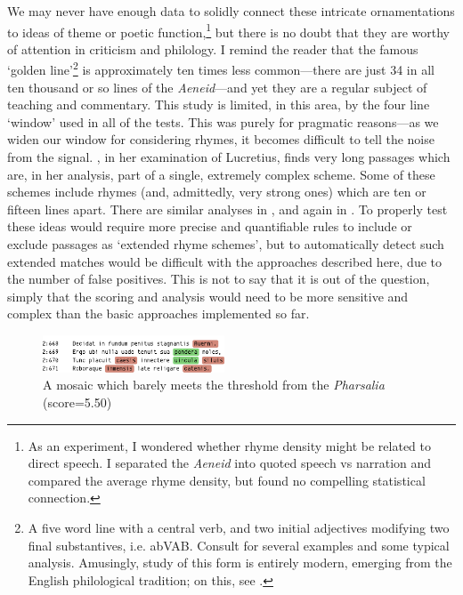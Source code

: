 \documentclass[twocolumn, switch]{article} %
\begin{document}
We may never have enough data to solidly connect these intricate
ornamentations to ideas of theme or poetic function,\footnote{
  As an experiment, I wondered whether rhyme density might be related to direct
  speech. I separated the \emph{Aeneid} into quoted speech vs narration and
  compared the average rhyme density, but found no compelling statistical connection.
}
but there is no doubt that they are worthy of attention in
criticism and philology. I remind the reader that the famous `golden line'\footnote{
  A five word line with a central verb, and two initial adjectives modifying
  two final substantives, i.e. abVAB. Consult
   for several examples and some typical
  analysis. Amusingly, study of this form is entirely modern, emerging from the
  English philological tradition; on this, see .
}
is approximately ten times less common---there are just 34 in all ten thousand
or so lines of the \emph{Aeneid}---and yet they are a regular subject of
teaching and commentary. This study is limited, in this area, by the four line
`window' used in all of the tests. This was purely for pragmatic reasons---as
we widen our window for considering rhymes, it becomes difficult to tell the
noise from the signal. \citeauthor{deutsch_1978}, in her examination of
Lucretius, finds very long passages which are, in her analysis, part of a
single, extremely complex scheme. Some of these schemes include rhymes (and,
admittedly, very strong ones) which are ten or fifteen lines apart. There are
similar analyses in , and again in
. To properly test these ideas would
require more precise and quantifiable rules to include or exclude passages as
`extended rhyme schemes', but to automatically detect such extended matches
would be difficult with the approaches described here, due to the number of
false positives. This is not to say that it is out of the question, simply
that the scoring and analysis would need to be more sensitive and complex than
the basic approaches implemented so far.

\begin{figure}
    \caption{A mosaic which barely meets the threshold from the \emph{Pharsalia} (score=5.50)}
    \label{fig:phars_barely}
    \centering
    \includegraphics[width=0.48\textwidth]{phars_barely.pdf}
\end{figure}
\end{document}
